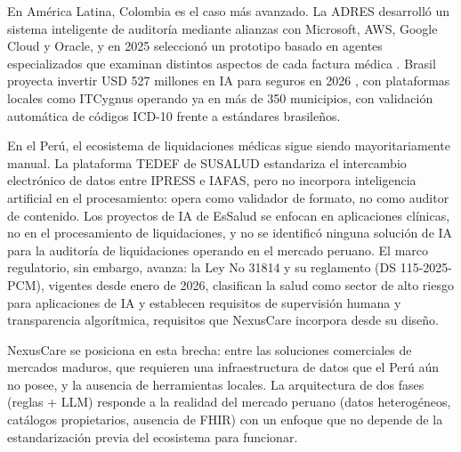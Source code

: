 En América Latina, Colombia es el caso más avanzado. La ADRES desarrolló un sistema inteligente de auditoría mediante alianzas con Microsoft, AWS, Google Cloud y Oracle, y en 2025 seleccionó un prototipo basado en agentes especializados que examinan distintos aspectos de cada factura médica \cite{consultorsalud2025adres}. Brasil proyecta invertir USD 527 millones en IA para seguros en 2026 \cite{cnseg2026ia}, con plataformas locales como ITCygnus operando ya en más de 350 municipios, con validación automática de códigos ICD-10 frente a estándares brasileños.

En el Perú, el ecosistema de liquidaciones médicas sigue siendo mayoritariamente manual. La plataforma TEDEF de SUSALUD estandariza el intercambio electrónico de datos entre IPRESS e IAFAS, pero no incorpora inteligencia artificial en el procesamiento: opera como validador de formato, no como auditor de contenido. Los proyectos de IA de EsSalud se enfocan en aplicaciones clínicas, no en el procesamiento de liquidaciones, y no se identificó ninguna solución de IA para la auditoría de liquidaciones operando en el mercado peruano. El marco regulatorio, sin embargo, avanza: la Ley No 31814 y su reglamento (DS 115-2025-PCM), vigentes desde enero de 2026, clasifican la salud como sector de alto riesgo para aplicaciones de IA y establecen requisitos de supervisión humana y transparencia algorítmica, requisitos que NexusCare incorpora desde su diseño.

NexusCare se posiciona en esta brecha: entre las soluciones comerciales de mercados maduros, que requieren una infraestructura de datos que el Perú aún no posee, y la ausencia de herramientas locales. La arquitectura de dos fases (reglas + LLM) responde a la realidad del mercado peruano (datos heterogéneos, catálogos propietarios, ausencia de FHIR) con un enfoque que no depende de la estandarización previa del ecosistema para funcionar.

\newpage
